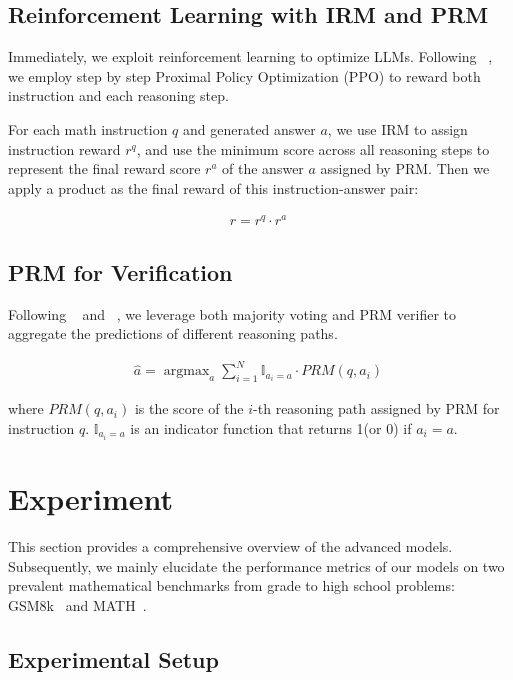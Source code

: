 \subsection{Reinforcement Learning with IRM and PRM}

Immediately, we exploit reinforcement learning to optimize LLMs. Following ~\citep{lightman2023openai-verify-step-by-step}, we employ step by step Proximal Policy Optimization (PPO) to reward both instruction and each reasoning step.

For each math instruction $q$ and generated answer $a$, we use IRM to assign instruction reward $r^q$, and use the minimum score across all reasoning steps to represent the final reward score $r^a$ of the answer $a$ assigned by PRM. Then we apply a product as the final reward of this instruction-answer pair:

\begin{align}
r = r^q \cdot r^a \
\label{eq:final-loss}
\end{align}

\subsection{PRM for Verification} Following ~\citep{lightman2023openai-verify-step-by-step} and ~\citep{li-etal-2023-making}, we leverage both majority voting and PRM verifier to  aggregate the predictions of different reasoning paths.

\begin{align}
\hat{a} = \mathop{\arg\max}_{a} \sum_{i=1}^{N} \mathbb{I}_{a_i = a} \cdot PRM(q, a_i)\
\label{eq:loss}
\end{align}

where $PRM(q, a_i)$ is the score of the $i$-th reasoning path assigned by PRM for instruction $q$.  $\mathbb{I}_{a_i = a}$ is an indicator function that returns 1(or 0) if $a_i = a$. 

\section{Experiment}

This section provides a comprehensive overview of the advanced models. Subsequently, we mainly elucidate the performance metrics of our models on two prevalent mathematical benchmarks from grade to high school problems: GSM8k~\citep{cobbe2021training_gsm8k_2} and MATH~\citep{hendrycks2021measuring}.

\subsection{Experimental Setup} \label{sections: exper-setup}

